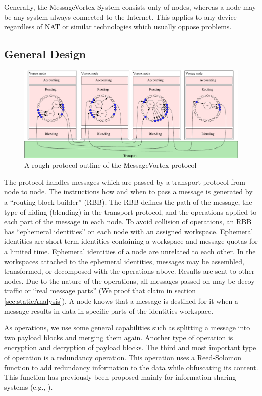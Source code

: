 \documentclass[10pt,journal,compsoc]{IEEEtran}
\let\MYoriglatexcaption\caption
\renewcommand{\caption}[2][\relax]{\MYoriglatexcaption[#2]{#2}}
\begin{document}
Generally, the MessageVortex System consists only of nodes, whereas a node may be any system always connected to the Internet. This applies to any device regardless of NAT or similar technologies which usually oppose problems.

\subsection{General Design}
\begin{figure}[ht!]
	\centering\includegraphics[width=\columnwidth]{../../inc/roughProtocolDesign.pdf}
	\caption{A rough protocol outline of the MessageVortex protocol}\label{fig:protocolOutline}
\end{figure}

The protocol handles messages which are passed by a transport protocol from node to node. The instructions how and when to pass a message is generated by a ``routing block builder'' (RBB). The RBB defines the path of the message, the type of hiding (blending) in the transport protocol, and the operations applied to each part of the message in each node. To avoid collision of operations, an RBB has ``ephemeral identities'' on each node with an assigned workspace. Ephemeral identities are short term identities containing a workspace and message quotas for a limited time. Ephemeral identities of a node are unrelated to each other. In the workspaces attached to the ephemeral identities, messages may be assembled, transformed, or decomposed with the operations above. Results are sent to other nodes. Due to the nature of the operations, all messages passed on may be decoy traffic or ``real message parts'' (We proof that claim in section \ref{sec:staticAnalysis}). A node knows that a message is destined for it when a message results in data in specific parts of the identities workspace.

As operations, we use some general capabilities such as splitting a message into two payload blocks and merging them again. Another type of operation is encryption and decryption of payload blocks. The third and most important type of operation is a redundancy operation. This operation uses a Reed-Solomon\cite{reed1960polynomial} function to add redundancy information to the data while obfuscating its content. This function has previously been proposed mainly for information sharing systems (e.g., \cite{mceliece1981sharing}).
\end{document}
